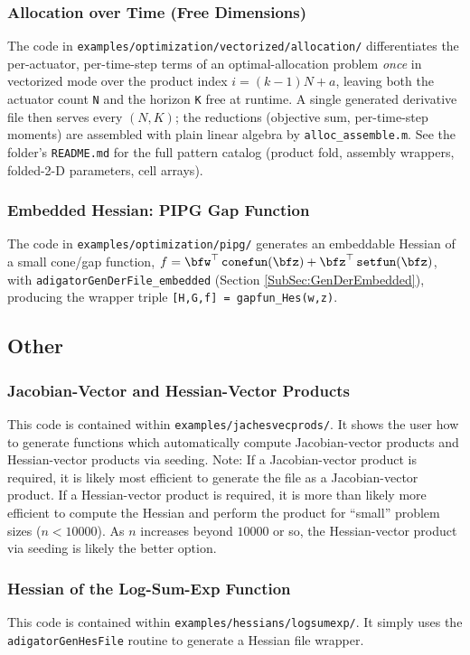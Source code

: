 \documentclass[10pt,pdftex]{article}
\begin{document}
\subsubsection{Allocation over Time (Free Dimensions)}
The code in \texttt{examples/optimization/vectorized/allocation/} differentiates the per-actuator, per-time-step terms of an optimal-allocation problem \emph{once} in vectorized mode over the product index $i = (k-1)N+a$, leaving both the actuator count \texttt{N} and the horizon \texttt{K} free at runtime. A single generated derivative file then serves every $(N,K)$; the reductions (objective sum, per-time-step moments) are assembled with plain linear algebra by \texttt{alloc\_assemble.m}. See the folder's \texttt{README.md} for the full pattern catalog (product fold, assembly wrappers, folded-2-D parameters, cell arrays).

\subsubsection{Embedded Hessian: PIPG Gap Function}
The code in \texttt{examples/optimization/pipg/} generates an embeddable Hessian of a small cone/gap function, $f = \bfw^\top\,\texttt{conefun}(\bfz) + \bfz^\top\,\texttt{setfun}(\bfz)$, with \texttt{adigatorGenDerFile\_embedded} (Section \ref{SubSec:GenDerEmbedded}), producing the wrapper triple \texttt{[H,G,f] = gapfun\_Hes(w,z)}.

\subsection{Other}
\subsubsection{Jacobian-Vector and Hessian-Vector Products}
This code is contained within \texttt{examples/jachesvecprods/}. It shows the user how to generate functions which automatically compute Jacobian-vector products and Hessian-vector products via seeding. Note: If a Jacobian-vector product is required, it is likely most efficient to generate the file as a Jacobian-vector product. If a Hessian-vector product is required, it is more than likely more efficient to compute the Hessian and perform the product for ``small'' problem sizes ($n < 10000$). As $n$ increases beyond $10000$ or so, the Hessian-vector product via seeding is likely the better option.
\subsubsection{Hessian of the Log-Sum-Exp Function}
This code is contained within \texttt{examples/hessians/logsumexp/}. It simply uses the \texttt{adigatorGenHesFile} routine to generate a Hessian file wrapper.
\end{document}
